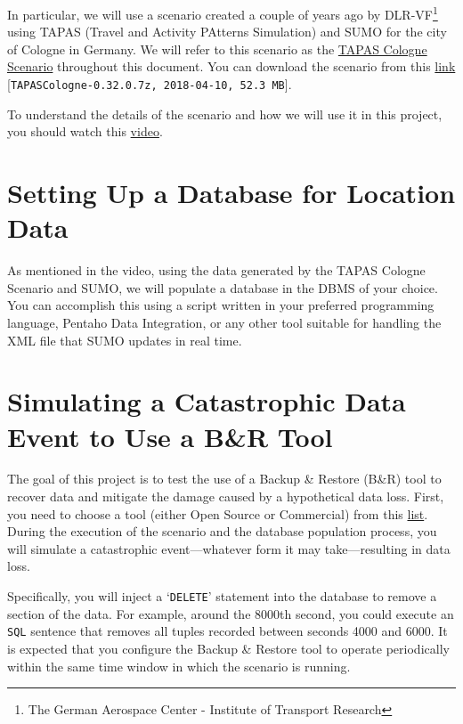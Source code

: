 \documentclass{article}
\begin{document}
In particular, we will use a scenario created a couple of years ago by DLR-VF\footnote{The German Aerospace Center - Institute of Transport Research} using TAPAS (Travel and Activity PAtterns Simulation) and SUMO for the city of Cologne in Germany. We will refer to this scenario as the \href{https://sumo.dlr.de/docs/Data/Scenarios/TAPASCologne.html}{TAPAS Cologne Scenario} throughout this document. You can download the scenario from this \href{https://sourceforge.net/projects/sumo/files/traffic_data/scenarios/TAPASCologne/}{link} [\texttt{TAPASCologne-0.32.0.7z, 2018-04-10, 52.3 MB}].

To understand the details of the scenario and how we will use it in this project, you should watch this \href{https://drive.google.com/file/d/1Deg6SjXcAUJahbNQ_YmvbhmbWuaVtD6y/view?usp=sharing}{video}.

\section{Setting Up a Database for Location Data}
As mentioned in the video, using the data generated by the TAPAS Cologne Scenario and SUMO, we will populate a database in the DBMS of your choice. You can accomplish this using a script written in your preferred programming language, Pentaho Data Integration, or any other tool suitable for handling the XML file that SUMO updates in real time.

\section{Simulating a Catastrophic Data Event to Use a B\&R Tool}
The goal of this project is to test the use of a Backup \& Restore (B\&R) tool to recover data and mitigate the damage caused by a hypothetical data loss. First, you need to choose a tool (either Open Source or Commercial) from this \href{https://drive.google.com/file/d/1089znTsPLuTGaxKYkdJkx7ZIOl4tV1QX/view?usp=sharing}{list}. During the execution of the scenario and the database population process, you will simulate a catastrophic event—whatever form it may take—resulting in data loss.

Specifically, you will inject a `\texttt{DELETE}' statement into the database to remove a section of the data. For example, around the 8000th second, you could execute an \texttt{SQL} sentence that removes all tuples recorded between seconds 4000 and 6000. It is expected that you configure the Backup \& Restore tool to operate periodically within the same time window in which the scenario is running.
\end{document}
